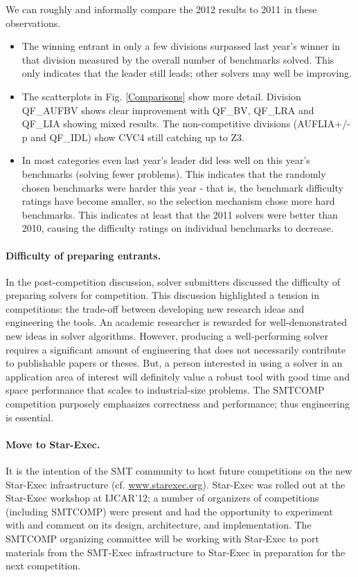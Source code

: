 \documentclass[twosize,11pt]{article}
\begin{document}
We can roughly and informally compare the 2012 results to 2011 in these observations.
\begin{itemize}
\item The winning entrant in only a few divisions surpassed last year's winner in that division measured by the overall number of benchmarks solved. This only indicates that the leader still leads; other solvers may well be improving.
\item The scatterplots in Fig. \ref{Comparisons} show more detail. Division QF\_AUFBV shows clear improvement with QF\_BV, QF\_LRA and QF\_LIA showing mixed results. The non-competitive divisions (AUFLIA+/-p and QF\_IDL) show CVC4 still catching up to Z3.
\item In most categories even last year's leader did less well on this year's benchmarks (solving fewer problems). This indicates that the randomly chosen benchmarks were harder this year - that is, the benchmark difficulty ratings have become smaller, so the selection mechanism chose more hard benchmarks. This indicates at least that the 2011 solvers were better than 2010, causing the difficulty ratings on individual benchmarks to decrease.
\end{itemize}

\paragraph{Difficulty of preparing entrants.} In the post-competition discussion, solver submitters discussed the difficulty of preparing solvers for competition. This discussion highlighted a tension in competitions: the trade-off between developing new research ideas and engineering the tools. An academic researcher is rewarded for well-demonstrated new ideas in solver algorithms. However, producing a well-performing solver requires a significant amount of engineering that does not necessarily contribute to publishable papers or theses. 
But, a person interested in using a solver in an application area of interest will definitely value a robust tool with good time and space performance that scales to industrial-size problems. The SMTCOMP competition purposely emphasizes correctness and performance; thus engineering is essential.

\paragraph{Move to Star-Exec.} It is the intention of the SMT community to host future competitions on the new Star-Exec infrastructure (cf. \url{www.starexec.org}). Star-Exec was rolled out at the Star-Exec workshop at IJCAR'12; a number of organizers of competitions (including SMTCOMP) were present and had the opportunity to experiment with and comment on its 
design, architecture, and implementation. The SMTCOMP organizing committee will be working with Star-Exec to port materials from the SMT-Exec infrastructure to Star-Exec in preparation for the next competition.
\end{document}
